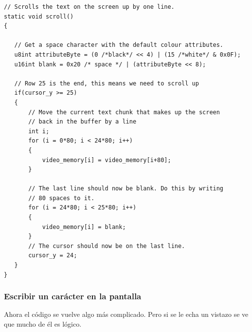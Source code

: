 \documentclass{report}
\begin{document}
\begin{lstlisting}
// Scrolls the text on the screen up by one line.
static void scroll()
{

   // Get a space character with the default colour attributes.
   u8int attributeByte = (0 /*black*/ << 4) | (15 /*white*/ & 0x0F);
   u16int blank = 0x20 /* space */ | (attributeByte << 8);

   // Row 25 is the end, this means we need to scroll up
   if(cursor_y >= 25)
   {
       // Move the current text chunk that makes up the screen
       // back in the buffer by a line
       int i;
       for (i = 0*80; i < 24*80; i++)
       {
           video_memory[i] = video_memory[i+80];
       }

       // The last line should now be blank. Do this by writing
       // 80 spaces to it.
       for (i = 24*80; i < 25*80; i++)
       {
           video_memory[i] = blank;
       }
       // The cursor should now be on the last line.
       cursor_y = 24;
   }
}
\end{lstlisting}

\subsubsection{Escribir un car\'{a}cter en la pantalla}

Ahora el c\'{o}digo se vuelve algo m\'{a}s complicado. Pero si se le echa un vistazo se ve que mucho de \'{e}l es l\'{o}gico.
\end{document}
